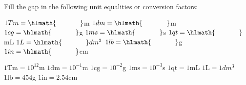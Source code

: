 \documentclass[main.tex]{subfiles}
\begin{document}
\begin{multicols*}{2}
\begin{question}[ID=\the\value{numA}]
Fill the gap in the following unit equalities or conversion factors:
\begin{multicols}{2}  
\noindent\RaggedRight
 $1Tm=\hlmath{\hspace{35pt }}$m
  $1dm=\hlmath{\hspace{35pt }}$m
   $1cg=\hlmath{\hspace{35pt }}$g
   $1ms=\hlmath{\hspace{35pt }}$s
  $1qt=\hlmath{\hspace{35pt }}$mL
  $1L=\hlmath{\hspace{35pt }}dm^3$
  $1lb=\hlmath{\hspace{35pt }}$g
  $1in=\hlmath{\hspace{35pt }}$cm
 \end{multicols}
\end{question}
\begin{solution}
$1\text{Tm}= 10^{12}$m
  $1\text{dm}= 10^{-1}$m
   $1\text{cg}= 10^{-2}$g
   $1\text{ms}= 10^{-3}$s
  $1\text{qt}= 1$mL
  $1\text{L}= 1dm^3$
  $1\text{lb}= 454$g
  $1\text{in}= 2.54$cm
\hspace{0.1cm}\end{solution}%




\end{multicols*}
\end{document}
